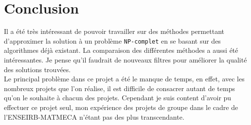 \documentclass[a4paper,12pt]{article}
\begin{document}
\section{Conclusion}
Il a été très intéressant de pouvoir travailler sur des méthodes permettant
d'approximer la solution à un problème \verb!NP-complet! en se basant sur des
algorithmes déjà existant. La comparaison des différentes méthodes a aussi été
intéressantes. Je pense qu'il faudrait de nouveaux filtres pour améliorer la
qualité des solutions trouvées.
\\
Le principal problème dans ce projet a été le manque de temps, en effet, avec
les nombreux projets que l'on réalise, il est difficile de consacrer autant de
temps qu'on le souhaite à chacun des projets. Cependant je suis content d'avoir
pu effectuer ce projet seul, mon expérience des projets de groupe dans le cadre
de l'ENSEIRB-MATMECA n'étant pas des plus transcendante.
\end{document}
